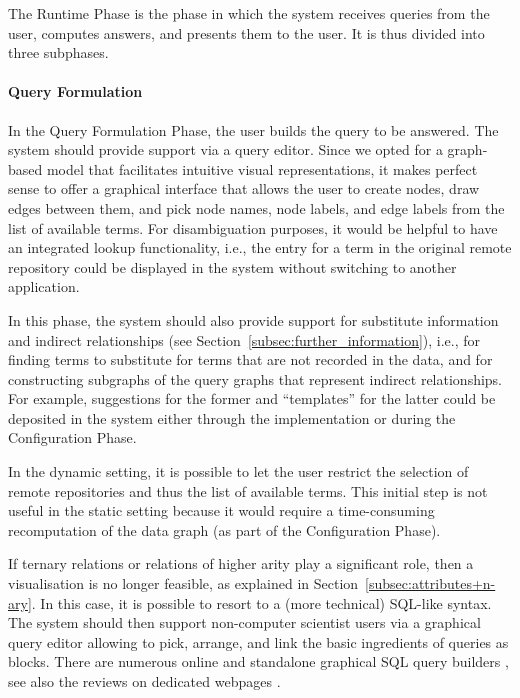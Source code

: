 The Runtime Phase is the phase in which the system receives queries from the user,
computes answers, and presents them to the user. It is thus divided into
three subphases.

\paragraph{Query Formulation}

In the Query Formulation Phase, the user builds the query
to be answered. The system should provide support via a query editor.
Since we opted for a graph-based model
that facilitates intuitive visual representations,
it makes perfect sense to offer a graphical interface
that allows the user to create nodes, draw edges between them,
and pick node names, node labels, and edge labels from the list of available terms.
For disambiguation purposes, it would be helpful to have an
integrated lookup functionality, i.e., the entry for a term
in the original remote repository could be displayed in the system
without switching to another application.

In this phase, the system should also provide support 
for substitute information and indirect relationships
(see Section~\ref{subsec:further_information}),
i.e., for finding terms to substitute for terms that are not recorded in the data,
and for constructing subgraphs of the query graphs that represent indirect
relationships. For example, suggestions for the former
and \enquote{templates} for the latter could be deposited in the system
either through the implementation or during the Configuration Phase.

In the dynamic setting, it is possible to let the user
restrict the selection of remote repositories and thus the list of available terms.
This initial step is not useful in the static setting
because it would require a time-consuming recomputation
of the data graph (as part of the Configuration Phase).

If ternary relations or relations of higher arity play a significant role,
then a visualisation is no longer feasible, as explained in Section~\ref{subsec:attributes+n-ary}.
In this case, it is possible to resort to a (more technical)
SQL-like syntax. The system should then support non-computer scientist users via 
a graphical query editor allowing to pick, arrange, and link
the basic ingredients of queries as blocks.
There are numerous online and standalone graphical SQL query builders
\autocite[e.g.,][]{VisualSQL,SQLeo}, see also the reviews on dedicated webpages
\autocite[e.g.,][]{ChartioVisualSQL,FinOnlBestVisualQueryBuilders}.

